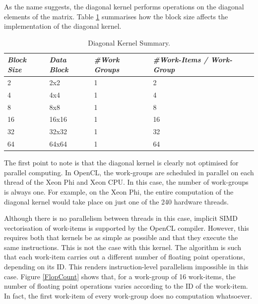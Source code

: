 \par{As the name suggests, the diagonal kernel performs operations on the diagonal elements of the matrix. 
    Table \ref{tab:lu1} summarises how the block size affects the implementation of the diagonal kernel.}

\begin{table}[!h]
    \centering
    \begin{tabular}{| l | l | l | l |}
    \hline
    \emph{Block Size} & \emph{Data Block} & \emph{\#Work Groups} & \emph{\#Work-Items / Work-Group} \\ \hline
    2 & 2x2 & 1 & 2 \\ \hline
    4 & 4x4 & 1 & 4 \\ \hline
    8 & 8x8 & 1 & 8 \\ \hline
    16 & 16x16 & 1 & 16 \\ \hline
    32 & 32x32 & 1 & 32 \\ \hline
    64 & 64x64 & 1 & 64\\ \hline
    \end{tabular}
    \caption{Diagonal Kernel Summary.}
    \label{tab:lu1}
\end{table}

\par{The first point to note is that the diagonal kernel is clearly not optimised for parallel computing. 
    In OpenCL, the work-groups are scheduled in parallel on each thread of the Xeon Phi and Xeon CPU. 
    In this case, the number of work-groups is always one. For example, on the Xeon Phi, 
    the entire computation of the diagonal kernel would take place on just one of the 240 hardware threads.}

\par{Although there is no parallelism between threads in this case, implicit SIMD vectorisation of work-items is supported 
    by the OpenCL compiler. However, this requires both that kernels be as simple as possible and that they execute the same 
    instructions. This is not the case with this kernel. The algorithm is such that each work-item carries out a different 
    number of floating point operations, depending on its ID. This renders instruction-level parallelism impossible in this case. 
    Figure \ref{FlopCount} shows that, for a work-group of 16 work-items, the number of floating point operations varies according to 
    the ID of the work-item. In fact, the first work-item of every work-group does no computation whatsoever.}


